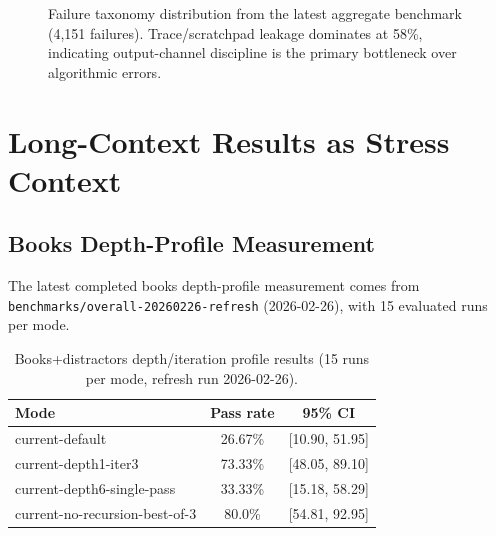 \documentclass[11pt]{article}
\begin{document}
\begin{figure}[t]
\centering
{}
\caption{Failure taxonomy distribution from the latest aggregate benchmark (4{,}151 failures). Trace/scratchpad leakage dominates at 58\%, indicating output-channel discipline is the primary bottleneck over algorithmic errors.}
\label{fig:failure-taxonomy}
\end{figure}

\section{Long-Context Results as Stress Context}
\subsection{Books Depth-Profile Measurement}
The latest completed books depth-profile measurement comes from \texttt{benchmarks/overall-20260226-refresh} (2026-02-26), with 15 evaluated runs per mode.

\begin{table}[t]
\centering
\caption{Books+distractors depth/iteration profile results (15 runs per mode, refresh run 2026-02-26).}
\label{tab:books-depth}
\begin{tabular}{lcc}
\toprule
Mode & Pass rate & 95\% CI \\
\midrule
current-default & 26.67\% & [10.90, 51.95] \\
current-depth1-iter3 & 73.33\% & [48.05, 89.10] \\
current-depth6-single-pass & 33.33\% & [15.18, 58.29] \\
current-no-recursion-best-of-3 & 80.0\% & [54.81, 92.95] \\
\bottomrule
\end{tabular}
\end{table}
\end{document}
